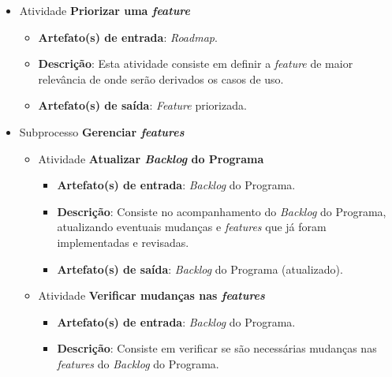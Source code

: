 \begin{itemize}
\begin{itemize}
	  \end{itemize}
	  
     \item Atividade \textbf{Priorizar uma \textit{feature}}
      
	  \begin{itemize}
	    \item \textbf{Artefato(s) de entrada}: \textit{Roadmap}.
	    
	    \item \textbf{Descrição}: Esta atividade consiste em definir a \textit{feature} de maior relevância
	      de onde serão derivados os casos de uso.
	    
	    \item \textbf{Artefato(s) de saída}: \textit{Feature} priorizada.
		  
	  \end{itemize}
	
     \item Subprocesso \textbf{Gerenciar \textit{features}}
     
	\begin{itemize}
	 
	 \item Atividade \textbf{Atualizar \textit{Backlog} do Programa}
	    
	    \begin{itemize}
	      \item \textbf{Artefato(s) de entrada}: \textit{Backlog} do Programa.

	      \item \textbf{Descrição}: Consiste no acompanhamento do \textit{Backlog} do Programa, atualizando
		eventuais mudanças e \textit{features} que já foram implementadas e revisadas.
	      
	      \item \textbf{Artefato(s) de saída}: \textit{Backlog} do Programa (atualizado).
		    
	    \end{itemize}
	    
	 \item Atividade \textbf{Verificar mudanças nas \textit{features}}
	    
	    \begin{itemize}
	      \item \textbf{Artefato(s) de entrada}: \textit{Backlog} do Programa.

	      \item \textbf{Descrição}: Consiste em verificar se são necessárias mudanças nas \textit{features} do
		\textit{Backlog} do Programa.
	      

\end{itemize}
\end{itemize}
\end{itemize}
